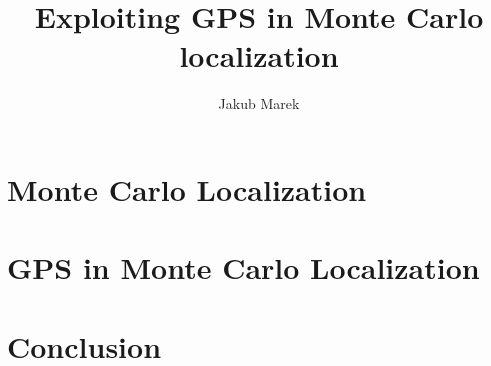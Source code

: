 \documentclass[11pt,a4paper,pdftex,twoside]{memoir}
\title{Exploiting GPS in Monte Carlo localization}
\author{Jakub Marek}
\begin{document}








\chapter{Monte Carlo Localization}

\chapter{GPS in Monte Carlo Localization}

\chapter{Conclusion}


\end{document}
